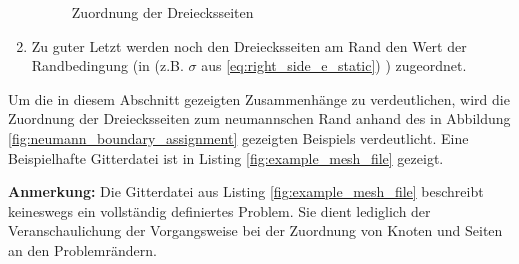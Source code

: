 \begin{enumerate}
\begin{figure}[H]
\begin{center}
		\end{center}
		\caption{Zuordnung der Dreiecksseiten}
		\label{fig:triangle_side_assignment}
	\end{figure}
	\item Zu guter Letzt werden noch den Dreiecksseiten am Rand den Wert der Randbedingung (in (z.B. $\sigma$ aus \ref{eq:right_side_e_static}) ) zugeordnet.
\end{enumerate}

Um die in diesem Abschnitt gezeigten Zusammenhänge zu verdeutlichen, wird die Zuordnung der Dreiecksseiten zum neumannschen Rand anhand des in Abbildung \ref{fig:neumann_boundary_assignment} gezeigten Beispiels verdeutlicht. Eine Beispielhafte Gitterdatei ist in Listing \ref{fig:example_mesh_file} gezeigt.\newline

\textbf{Anmerkung:} Die Gitterdatei aus Listing \ref{fig:example_mesh_file} beschreibt keineswegs ein vollständig definiertes Problem. Sie dient lediglich der Veranschaulichung der Vorgangsweise bei der Zuordnung von Knoten und Seiten an den Problemrändern.



